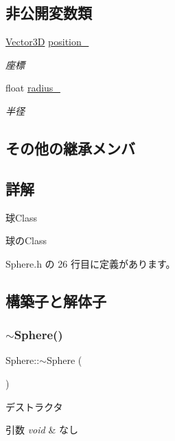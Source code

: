 \subsection*{非公開変数類}
\begin{DoxyCompactItemize}
\item 
\mbox{\hyperlink{class_vector3_d}{Vector3D}} \mbox{\hyperlink{class_sphere_a5a18bfcc7abcdfbd6802ec622dfa5590}{position\+\_\+}}
\begin{DoxyCompactList}\small\item\em 座標 \end{DoxyCompactList}\item 
float \mbox{\hyperlink{class_sphere_ac2924d9ad22bfad1ed1914c069c188dc}{radius\+\_\+}}
\begin{DoxyCompactList}\small\item\em 半径 \end{DoxyCompactList}\end{DoxyCompactItemize}
\subsection*{その他の継承メンバ}


\subsection{詳解}
球\+Class 

球の\+Class 

 Sphere.\+h の 26 行目に定義があります。



\subsection{構築子と解体子}
\mbox{\label{class_sphere_a569c071e50a3e11f678630ee1a17737e}} 
\subsubsection{\texorpdfstring{$\sim$\+Sphere()}{~Sphere()}}
{\footnotesize\ttfamily Sphere\+::$\sim$\+Sphere (\begin{DoxyParamCaption}{ }\end{DoxyParamCaption})}



デストラクタ 


\begin{DoxyParams}{引数}
{\em void} & なし \\
\hline
\end{DoxyParams}



